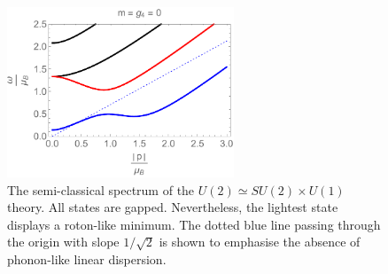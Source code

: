   \begin{figure}[h]
\begin{center}
\includegraphics[height=2.0in]{Chapter_3_Folder_1806.06976/figures/u2.pdf}
\end{center}
      \caption[This figure shows the semi-classical spectrum of the $U(2)\simeq SU(2)\times U(1)$ theory.]{ \small{The semi-classical spectrum of the $U(2)\simeq SU(2)\times U(1)$ theory. All states are gapped. Nevertheless, the lightest state displays a roton-like minimum. The dotted blue line passing through the origin with slope $1/\sqrt 2$ is shown to emphasise the absence of  phonon-like linear dispersion.}}
\label{u2}
\end{figure}

 
